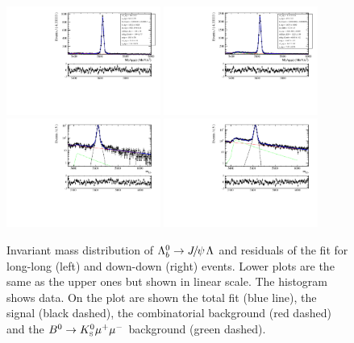 \begin{figure}
\centering
\includegraphics[width=0.45\textwidth]{Lmumu/figs/MassFits/Lb2JpsiL_LL_data_fitAndRes.pdf}
\includegraphics[width=0.45\textwidth]{Lmumu/figs/MassFits/Lb2JpsiL_DD_data_fitAndRes.pdf}
\includegraphics[width=0.45\textwidth]{Lmumu/figs/MassFits/Lb2JpsiL_LL_data_log_fitAndRes.pdf}
\includegraphics[width=0.45\textwidth]{Lmumu/figs/MassFits/Lb2JpsiL_DD_data_log_fitAndRes.pdf}
\caption{Invariant mass distribution of $\Lb\ra\jpsi\Lz$ and residuals of the fit for long-long (left) and 
down-down (right) events. Lower plots are the same as the upper ones but shown in linear scale.
The histogram shows data. On the plot are shown the total fit (blue line), the signal (black
dashed), the combinatorial background (red dashed) and the $B^0\rightarrow K^0_{\rm\scriptscriptstyle S}\mu^+\mu^-$ background (green dashed).}
\label{fig:Lb_totalFit}
\end{figure}
